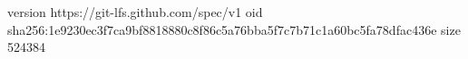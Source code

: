 version https://git-lfs.github.com/spec/v1
oid sha256:1e9230ec3f7ca9bf8818880c8f86c5a76bba5f7c7b71c1a60bc5fa78dfac436e
size 524384
